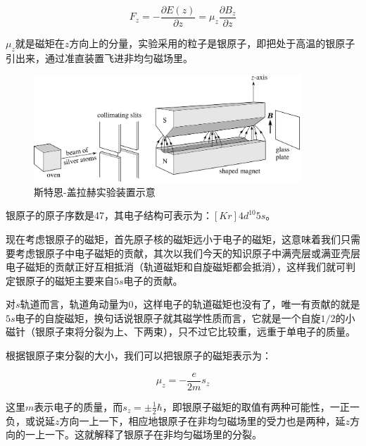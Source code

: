 \begin{equation}
F_z = - \frac{\partial E(z)}{\partial z} = \mu_z \frac{\partial B_z}{\partial z}
\end{equation}

$\mu_z$就是磁矩在$z$方向上的分量，实验采用的粒子是银原子，即把处于高温的银原子引出来，通过准直装置飞进非均匀磁场里。

\begin{figure}[htbp]
\begin{center}
\includegraphics[width=10cm]{SGExperiment/SGexperiment.png}
\caption{斯特恩-盖拉赫实验装置示意}
\end{center}
\end{figure}

银原子的原子序数是47，其电子结构可表示为：$[Kr] 4 d^{10} 5s$。

现在考虑银原子的磁矩，首先原子核的磁矩远小于电子的磁矩，这意味着我们只需要考虑银原子中电子磁矩的贡献，其次以我们今天的知识原子中满壳层或满亚壳层电子磁矩的贡献正好互相抵消（轨道磁矩和自旋磁矩都会抵消），这样我们就可判定银原子的磁矩主要来自$5s$电子的贡献。

对$s$轨道而言，轨道角动量为0，这样电子的轨道磁矩也没有了，唯一有贡献的就是$5s$电子的自旋磁矩，换句话说银原子就其磁学性质而言，它就是一个自旋$1/2$的小磁针（银原子束将分裂为上、下两束），只不过它比较重，远重于单电子的质量。

根据银原子束分裂的大小，我们可以把银原子的磁矩表示为：

\begin{equation}
\mu_z = - \frac{e}{2m } s_z
\end{equation}

这里$m$表示电子的质量，而$s_z = \pm \frac{1}{2} \hbar$，即银原子磁矩的取值有两种可能性，一正一负，或说延$z$方向一上一下，相应地银原子在非均匀磁场里的受力也是两种，延$z$方向的一上一下。这就解释了银原子在非均匀磁场里的分裂。

